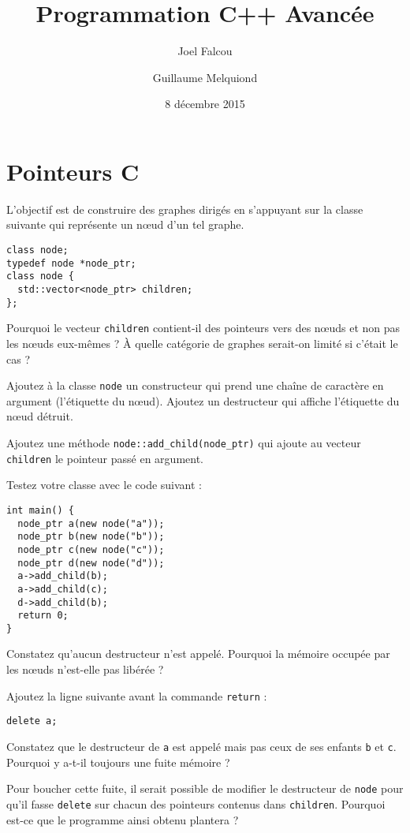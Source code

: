 \documentclass[a4paper]{article}
\title{\vspace{-2cm}Programmation C++ Avancée}
\author{Joel Falcou \and Guillaume Melquiond}
\date{8 décembre 2015}
\begin{document}
\maketitle

\section{Pointeurs C}

L'objectif est de construire des graphes dirigés en s'appuyant sur la
classe suivante qui représente un nœud d'un tel graphe.

\begin{lstlisting}
class node;
typedef node *node_ptr;
class node {
  std::vector<node_ptr> children;
};
\end{lstlisting}

Pourquoi le vecteur \lstinline|children| contient-il des pointeurs vers
des nœuds et non pas les nœuds eux-mêmes ? À quelle catégorie de graphes
serait-on limité si c'était le cas ?

Ajoutez à la classe \lstinline|node| un constructeur qui prend une chaîne
de caractère en argument (l'étiquette du nœud). Ajoutez un destructeur
qui affiche l'étiquette du nœud détruit.

Ajoutez une méthode \lstinline|node::add_child(node_ptr)| qui ajoute au
vecteur \lstinline|children| le pointeur passé en argument.

Testez votre classe avec le code suivant :
\begin{lstlisting}
int main() {
  node_ptr a(new node("a"));
  node_ptr b(new node("b"));
  node_ptr c(new node("c"));
  node_ptr d(new node("d"));
  a->add_child(b);
  a->add_child(c);
  d->add_child(b);
  return 0;
}
\end{lstlisting}

Constatez qu'aucun destructeur n'est appelé. Pourquoi la mémoire occupée
par les nœuds n'est-elle pas libérée ?

Ajoutez la ligne suivante avant la commande \lstinline|return| :
\begin{lstlisting}
delete a;
\end{lstlisting}

Constatez que le destructeur de \lstinline|a| est appelé mais pas ceux de
ses enfants \lstinline|b| et \lstinline|c|. Pourquoi y a-t-il toujours
une fuite mémoire ?

Pour boucher cette fuite, il serait possible de modifier le destructeur
de \lstinline|node| pour qu'il fasse \lstinline|delete| sur chacun des
pointeurs contenus dans \lstinline|children|. Pourquoi est-ce que le
programme ainsi obtenu plantera ?
\end{document}
